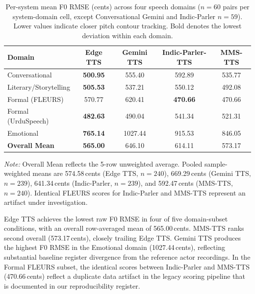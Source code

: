 \documentclass[a4paper,fleqn]{cas-dc}
\begin{document}
    \begin{table}[t]
    \caption{Per-system mean F0 RMSE (cents) across four speech domains
    ($n = 60$ pairs per system-domain cell, except Conversational Gemini and Indic-Parler $n=59$). Lower values indicate closer
    pitch contour tracking. Bold denotes the lowest deviation within
    each domain.}\label{tbl:f0_system}
    
    \small
    \renewcommand{\arraystretch}{1.15}
    
    \begin{tabular*}{\textwidth}{@{\extracolsep{\fill}}lcccc@{}}
    \toprule
    \textbf{Domain} & \textbf{Edge TTS} & \textbf{Gemini TTS} &
    \textbf{Indic-Parler-TTS} & \textbf{MMS-TTS} \\
    \midrule
    Conversational        & \textbf{500.95} & 555.40 & 592.89 & 535.77 \\
    Literary/Storytelling & \textbf{505.53} & 537.21 & 550.12 & 492.08 \\
    Formal (FLEURS)       & 570.77          & 620.41 & \textbf{470.66} & 470.66 \\
    Formal (UrduSpeech) & \textbf{482.63} & 490.04 & 541.34 & 521.31 \\
    Emotional             & \textbf{765.14} & 1027.44 & 915.53 & 846.05 \\
    \midrule
    \textbf{Overall Mean} & \textbf{565.00} & 646.10 & 614.11 & 573.17 \\
    \bottomrule
    \end{tabular*}
    \vspace{1mm}
    \footnotesize\textit{Note:} Overall Mean reflects the 5-row unweighted average. Pooled sample-weighted means are 574.58\,cents (Edge TTS, $n=240$), 669.29\,cents (Gemini TTS, $n=239$), 641.34\,cents (Indic-Parler, $n=239$), and 592.47\,cents (MMS-TTS, $n=240$). Identical FLEURS scores for Indic-Parler and MMS-TTS represent an artifact under investigation.
    \end{table}
    
    Edge TTS achieves the lowest raw F0 RMSE in four of five domain-subset
    conditions, with an overall row-averaged mean of 565.00\,cents. MMS-TTS ranks second
    overall (573.17\,cents), closely trailing Edge TTS. Gemini TTS produces the highest F0 RMSE in the Emotional
    domain (1027.44\,cents), reflecting substantial baseline register divergence from the reference actor recordings.
    In the Formal FLEURS subset, the identical scores between Indic-Parler and MMS-TTS (470.66\,cents)
    reflect a duplicate data artifact in the legacy scoring pipeline that is documented in our reproducibility register.
    
\end{document}

